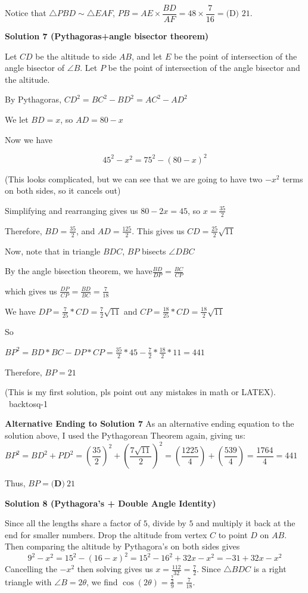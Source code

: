 \begin{enumerate}
 Notice that $\triangle PBD \sim \triangle EAF$, $PB = AE \times \dfrac{BD}{AF} = 48 \times \dfrac{7}{16} = \boxed{\text{(D) }21}.$




\textbf{Solution 7 (Pythagoras+angle bisector theorem)}

Let $CD$ be the altitude to side $AB$, and let $E$ be the point of intersection of the angle bisector of $\angle B$. Let $P$ be the point of intersection of the angle bisector and the altitude.

 By Pythagoras, $CD^2=BC^2-BD^2=AC^2-AD^2$

 We let $BD = x$, so $AD=80-x$

 Now we have

 
 \[45^2-x^2=75^2-(80-x)^2\]

 (This looks complicated, but we can see that we are going to have two $-x^2$ terms on both sides, so it cancels out)

 Simplifying and rearranging gives us $80-2x=45$, so $x=\frac{35}{2}$

 Therefore, $BD=\frac{35}{2}$, and $AD=\frac{125}{2}$. This gives us $CD=\frac{25}{2}\sqrt{11}$

 
Now, note that in triangle $BDC$, $BP$ bisects $\angle DBC$

 By the angle bisection theorem, we have$\frac{BD}{DP}=\frac{BC}{CP}$

 which gives us $\frac{DP}{CP}=\frac{BD}{BC}=\frac{7}{18}$

 We have $DP=\frac{7}{25}*CD=\frac{7}{2}\sqrt{11}$ and $CP=\frac{18}{25}*CD=\frac{18}{2}\sqrt{11}$

 So

 $BP^2=BD*BC-DP*CP=\frac{35}{2}*45-\frac{7}{2}*\frac{18}{2}*11=441$

 Therefore, $BP=21$

 (This is my first solution, pls point out any mistakes in math or LATEX). ~backtosq-1

 \textbf{Alternative Ending to Solution 7} As an alternative ending equation to the solution above, I used the Pythagorean Theorem again, giving us: $BP^2=BD^2+PD^2=(\dfrac{35}{2})^2+(\dfrac{7\sqrt{11}}{2})^2=(\dfrac{1225}{4})+(\dfrac{539}{4})=\dfrac{1764}{4}=441$

 Thus, $BP=\boxed{\textbf{(D)}~21}$




\textbf{Solution 8 (Pythagora's + Double Angle Identity)}

Since all the lengths share a factor of $5$, divide by $5$ and multiply it back at the end for smaller numbers. Drop the altitude from vertex $C$ to point $D$ on $AB$. Then comparing the altitude by Pythagora's on both sides gives 
 \[9^2-x^2=15^2-(16-x)^2=15^2-16^2+32x-x^2=-31+32x-x^2\]Cancelling the $-x^2$ then solving gives us $x=\frac{112}{32}=\frac{7}{2}$. Since $\triangle BDC$ is a right triangle with $\angle B=2\theta$, we find $\cos(2\theta)=\frac{\frac{7}{2}}{9}=\frac{7}{18}$.


\end{enumerate}

